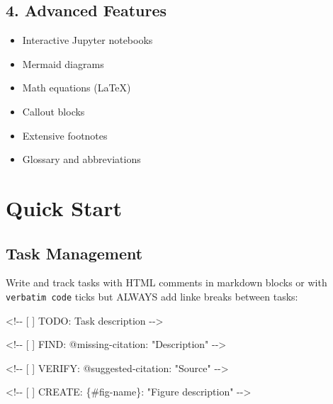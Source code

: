 \documentclass[
  11pt,
  letterpaper,
]{book}
\newenvironment{Shaded}{\begin{snugshade}}{\end{snugshade}}
\newcommand{\InformationTok}[1]{\textcolor[rgb]{0.37,0.37,0.37}{#1}}
\providecommand{\tightlist}{%
  \setlength{\itemsep}{0pt}\setlength{\parskip}{0pt}}
\begin{document}
\subsection*{4. Advanced Features}\label{advanced-features}

\begin{itemize}
\tightlist
\item
  Interactive Jupyter notebooks
\item
  Mermaid diagrams
\item
  Math equations (LaTeX)
\item
  Callout blocks
\item
  Extensive footnotes
\item
  Glossary and abbreviations
\end{itemize}

\section*{Quick Start}\label{quick-start}


\subsection*{Task Management}\label{task-management}

Write and track tasks with HTML comments in markdown blocks or with
\texttt{verbatim\ code} ticks but ALWAYS add linke breaks between tasks:

\begin{Shaded}
\begin{Highlighting}[]
\InformationTok{\textasciigrave{}\textless{}!{-}{-} [ ] TODO: Task description {-}{-}\textgreater{}\textasciigrave{}}

\InformationTok{\textasciigrave{}\textless{}!{-}{-} [ ] FIND: @missing{-}citation: "Description" {-}{-}\textgreater{}\textasciigrave{}}

\InformationTok{\textasciigrave{}\textless{}!{-}{-} [ ] VERIFY: @suggested{-}citation: "Source" {-}{-}\textgreater{}\textasciigrave{}}

\InformationTok{\textasciigrave{}\textless{}!{-}{-} [ ] CREATE: \{\#fig{-}name\}: "Figure description" {-}{-}\textgreater{}\textasciigrave{}}
\end{Highlighting}
\end{Shaded}
\end{document}
